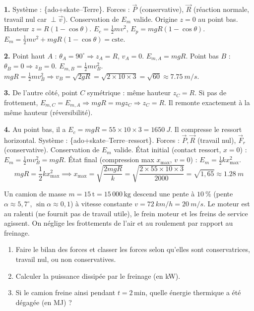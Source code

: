 \documentclass[11pt]{article}
\begin{document}
\begin{corrige}
\textbf{1.} Système : \{ado+skate–Terre\}. Forces : $\vec{P}$ (conservative), $\vec{R}$ (réaction normale, travail nul car $\perp \vec{v}$). Conservation de $E_m$ valide.
Origine $z=0$ au point bas. Hauteur $z = R(1-\cos\theta)$.
$E_c = \frac{1}{2}mv^2$, $E_p = mgR(1-\cos\theta)$.
$E_m = \frac{1}{2}mv^2 + mgR(1-\cos\theta) = \text{cste}$.

\textbf{2.} Point haut $A$ : $\theta_A = 90^\circ \Rightarrow z_A = R$, $v_A=0$. $E_{m,A} = mgR$.
Point bas $B$ : $\theta_B = 0 \Rightarrow z_B = 0$. $E_{m,B} = \frac{1}{2}mv_B^2$.
$mgR = \frac{1}{2}mv_B^2 \Rightarrow v_B = \sqrt{2gR} = \sqrt{2\times10\times3} = \sqrt{60} \approx \SI{7,75}{m/s}$.

\textbf{3.} De l'autre côté, point $C$ symétrique : même hauteur $z_C = R$. Si pas de frottement, $E_{m,C} = E_{m,A} \Rightarrow mgR = mgz_C \Rightarrow z_C = R$. Il remonte exactement à la même hauteur (réversibilité).

\textbf{4.} Au point bas, il a $E_c = mgR = 55\times10\times3 = \SI{1650}{J}$. Il compresse le ressort horizontal.
Système : \{ado+skate–Terre–ressort\}. Forces : $\vec{P}, \vec{R}$ (travail nul), $\vec{F}_r$ (conservative). Conservation de $E_m$ valide.
État initial (contact ressort, $x=0$) : $E_m = \frac{1}{2}mv_B^2 = mgR$.
État final (compression max $x_{\text{max}}$, $v=0$) : $E_m = \frac{1}{2}kx_{\text{max}}^2$.
\[
mgR = \frac{1}{2}kx_{\text{max}}^2 \implies x_{\text{max}} = \sqrt{\frac{2mgR}{k}} = \sqrt{\frac{2\times55\times10\times3}{2000}} = \sqrt{1,65} \approx \SI{1,28}{m}
\]
\end{corrige}

\begin{exercice}
Un camion de masse $m = 15\,\text{t} = 15\,000\,\text{kg}$ descend une pente à $\SI{10}{\%}$ (pente $\alpha \approx 5,7^\circ$, $\sin\alpha \approx 0,1$) à vitesse constante $v = \SI{72}{km/h} = \SI{20}{m/s}$. Le moteur est au ralenti (ne fournit pas de travail utile), le frein moteur et les freins de service agissent. On néglige les frottements de l'air et au roulement par rapport au freinage.
\begin{enumerate}
    \item Faire le bilan des forces et classer les forces selon qu'elles sont conservatrices, travail nul, ou non conservatives.
    \item Calculer la puissance dissipée par le freinage (en kW).
    \item Si le camion freine ainsi pendant $t = 2\,\text{min}$, quelle énergie thermique a été dégagée (en MJ) ?
\end{enumerate}
\end{exercice}
\end{document}

